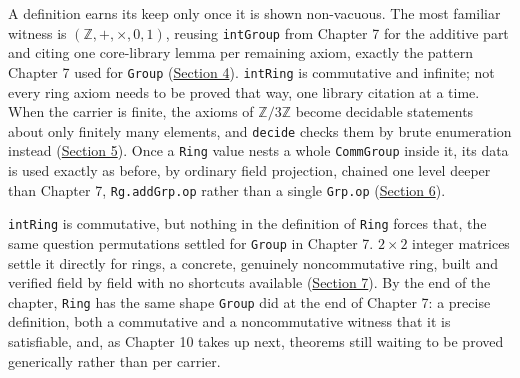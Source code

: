 A definition earns its keep only once it is shown non-vacuous. The most familiar witness is \((\mathbb{Z}, +, \times, 0, 1)\), reusing \texttt{intGroup} from Chapter 7 for the additive part and citing one core-library lemma per remaining axiom, exactly the pattern Chapter 7 used for \texttt{Group} (\hyperref[sec:09-rings:04-integers-example:1]{Section 4}). \texttt{intRing} is commutative and infinite; not every ring axiom needs to be proved that way, one library citation at a time. When the carrier is finite, the axioms of \(\mathbb{Z}/3\mathbb{Z}\) become decidable statements about only finitely many elements, and \texttt{decide} checks them by brute enumeration instead (\hyperref[sec:09-rings:05-finite-ring-example:1]{Section 5}). Once a \texttt{Ring} value nests a whole \texttt{CommGroup} inside it, its data is used exactly as before, by ordinary field projection, chained one level deeper than Chapter 7, \texttt{Rg.addGrp.op} rather than a single \texttt{Grp.op} (\hyperref[sec:09-rings:06-accessing-fields:1]{Section 6}).

\texttt{intRing} is commutative, but nothing in the definition of \texttt{Ring} forces that, the same question permutations settled for \texttt{Group} in Chapter 7. \(2\times 2\) integer matrices settle it directly for rings, a concrete, genuinely noncommutative ring, built and verified field by field with no shortcuts available (\hyperref[sec:09-rings:07-matrices:1]{Section 7}). By the end of the chapter, \texttt{Ring} has the same shape \texttt{Group} did at the end of Chapter 7: a precise definition, both a commutative and a noncommutative witness that it is satisfiable, and, as Chapter 10 takes up next, theorems still waiting to be proved generically rather than per carrier.










